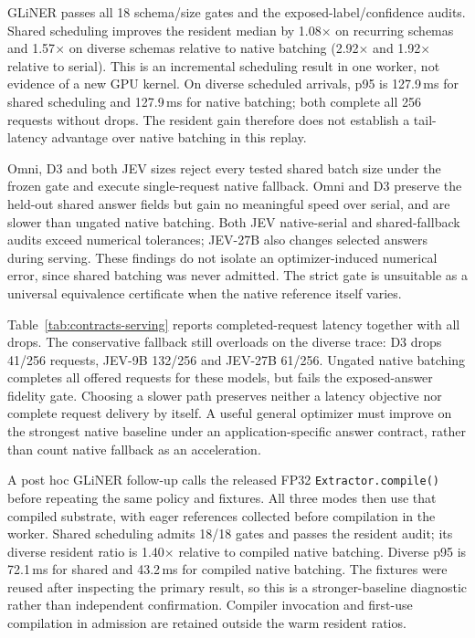 GLiNER passes all 18 schema/size gates and the exposed-label/confidence audits. Shared scheduling improves the resident median by 1.08$\times$ on recurring schemas and 1.57$\times$ on diverse schemas relative to native batching (2.92$\times$ and 1.92$\times$ relative to serial). This is an incremental scheduling result in one worker, not evidence of a new GPU kernel. On diverse scheduled arrivals, p95 is 127.9\,ms for shared scheduling and 127.9\,ms for native batching; both complete all 256 requests without drops. The resident gain therefore does not establish a tail-latency advantage over native batching in this replay.

Omni, D3 and both JEV sizes reject every tested shared batch size under the frozen gate and execute single-request native fallback. Omni and D3 preserve the held-out shared answer fields but gain no meaningful speed over serial, and are slower than ungated native batching. Both JEV native-serial and shared-fallback audits exceed numerical tolerances; JEV-27B also changes selected answers during serving. These findings do not isolate an optimizer-induced numerical error, since shared batching was never admitted. The strict gate is unsuitable as a universal equivalence certificate when the native reference itself varies.

Table~\ref{tab:contracts-serving} reports completed-request latency together with all drops. The conservative fallback still overloads on the diverse trace: D3 drops 41/256 requests, JEV-9B 132/256 and JEV-27B 61/256. Ungated native batching completes all offered requests for these models, but fails the exposed-answer fidelity gate. Choosing a slower path preserves neither a latency objective nor complete request delivery by itself. A useful general optimizer must improve on the strongest native baseline under an application-specific answer contract, rather than count native fallback as an acceleration.

A post hoc GLiNER follow-up calls the released FP32 \texttt{Extractor.compile()} before repeating the same policy and fixtures. All three modes then use that compiled substrate, with eager references collected before compilation in the worker. Shared scheduling admits 18/18 gates and passes the resident audit; its diverse resident ratio is 1.40$\times$ relative to compiled native batching. Diverse p95 is 72.1\,ms for shared and 43.2\,ms for compiled native batching. The fixtures were reused after inspecting the primary result, so this is a stronger-baseline diagnostic rather than independent confirmation. Compiler invocation and first-use compilation in admission are retained outside the warm resident ratios.
